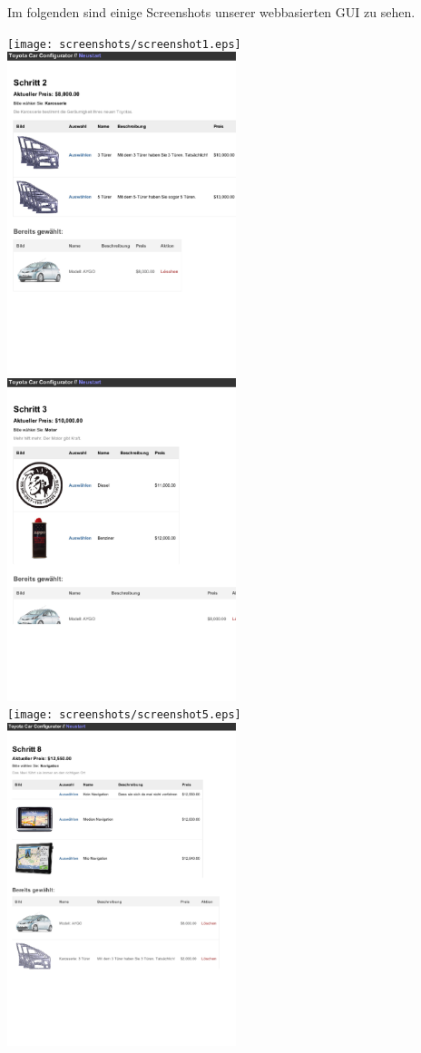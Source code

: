 \documentclass[a4paper,10pt]{article}
\begin{document}
Im folgenden sind einige Screenshots unserer webbasierten GUI zu sehen.

\texttt{[image: screenshots/screenshot1.eps]}
\\
\includegraphics[width=0.5\textwidth]{screenshots/screenshot2.eps}
\\
\includegraphics[width=0.5\textwidth]{screenshots/screenshot4.eps}
\\
\texttt{[image: screenshots/screenshot5.eps]}
\\
\includegraphics[width=0.5\textwidth]{screenshots/screenshot6.eps}
\end{document}
